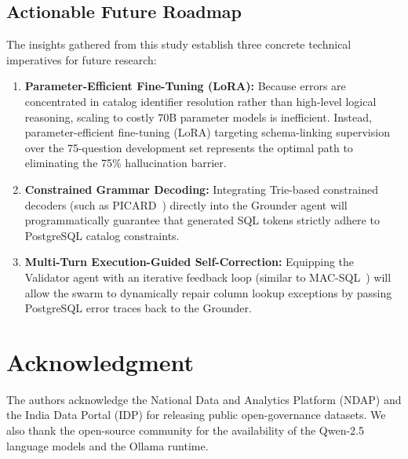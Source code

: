 \documentclass[conference]{IEEEtran}
\begin{document}
\subsection{Actionable Future Roadmap}
The insights gathered from this study establish three concrete technical imperatives for future research:
\begin{enumerate}
    \item \textbf{Parameter-Efficient Fine-Tuning (LoRA):} Because errors are concentrated in catalog identifier resolution rather than high-level logical reasoning, scaling to costly 70B parameter models is inefficient. Instead, parameter-efficient fine-tuning (LoRA) targeting schema-linking supervision over the 75-question development set represents the optimal path to eliminating the 75\% hallucination barrier.
    \item \textbf{Constrained Grammar Decoding:} Integrating Trie-based constrained decoders (such as PICARD~\cite{scholak2021picard}) directly into the Grounder agent will programmatically guarantee that generated SQL tokens strictly adhere to PostgreSQL catalog constraints.
    \item \textbf{Multi-Turn Execution-Guided Self-Correction:} Equipping the Validator agent with an iterative feedback loop (similar to MAC-SQL~\cite{wang2024macsql}) will allow the swarm to dynamically repair column lookup exceptions by passing PostgreSQL error traces back to the Grounder.
\end{enumerate}

\section*{Acknowledgment}
The authors acknowledge the National Data and Analytics Platform (NDAP) and the India Data Portal (IDP) for releasing public open-governance datasets. We also thank the open-source community for the availability of the Qwen-2.5 language models and the Ollama runtime.
\end{document}
